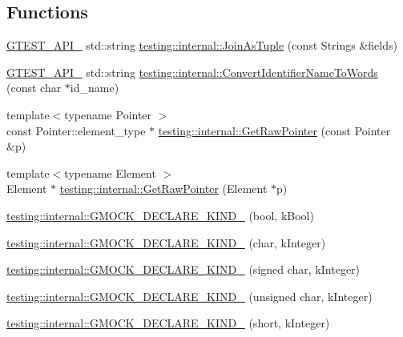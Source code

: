 \subsection*{Functions}
\begin{DoxyCompactItemize}
\item 
\mbox{\hyperlink{gtest-port_8h_aa73be6f0ba4a7456180a94904ce17790}{G\+T\+E\+S\+T\+\_\+\+A\+P\+I\+\_\+}} std\+::string \mbox{\hyperlink{namespacetesting_1_1internal_a4ffe5309bf49f08145ed010a6d244e41}{testing\+::internal\+::\+Join\+As\+Tuple}} (const Strings \&fields)
\item 
\mbox{\hyperlink{gtest-port_8h_aa73be6f0ba4a7456180a94904ce17790}{G\+T\+E\+S\+T\+\_\+\+A\+P\+I\+\_\+}} std\+::string \mbox{\hyperlink{namespacetesting_1_1internal_a0b375abcf3081393e6c420194a541b29}{testing\+::internal\+::\+Convert\+Identifier\+Name\+To\+Words}} (const char $\ast$id\+\_\+name)
\item 
{\footnotesize template$<$typename Pointer $>$ }\\const Pointer\+::element\+\_\+type $\ast$ \mbox{\hyperlink{namespacetesting_1_1internal_ae88d1a6f95165c43c27a6c0e2d357e61}{testing\+::internal\+::\+Get\+Raw\+Pointer}} (const Pointer \&p)
\item 
{\footnotesize template$<$typename Element $>$ }\\Element $\ast$ \mbox{\hyperlink{namespacetesting_1_1internal_a4d17b114b61b805ac5f37e9c26e29e55}{testing\+::internal\+::\+Get\+Raw\+Pointer}} (Element $\ast$p)
\item 
\mbox{\hyperlink{namespacetesting_1_1internal_a20f5584732e44a368e7acf295b639319}{testing\+::internal\+::\+G\+M\+O\+C\+K\+\_\+\+D\+E\+C\+L\+A\+R\+E\+\_\+\+K\+I\+N\+D\+\_\+}} (bool, k\+Bool)
\item 
\mbox{\hyperlink{namespacetesting_1_1internal_ac8f3722ca21d8b14f86e5c949e843508}{testing\+::internal\+::\+G\+M\+O\+C\+K\+\_\+\+D\+E\+C\+L\+A\+R\+E\+\_\+\+K\+I\+N\+D\+\_\+}} (char, k\+Integer)
\item 
\mbox{\hyperlink{namespacetesting_1_1internal_ae5b8e77d245fd0838ab22e439e92e9af}{testing\+::internal\+::\+G\+M\+O\+C\+K\+\_\+\+D\+E\+C\+L\+A\+R\+E\+\_\+\+K\+I\+N\+D\+\_\+}} (signed char, k\+Integer)
\item 
\mbox{\hyperlink{namespacetesting_1_1internal_ab13e89be2f0f22b1da9e22cd53bce5ce}{testing\+::internal\+::\+G\+M\+O\+C\+K\+\_\+\+D\+E\+C\+L\+A\+R\+E\+\_\+\+K\+I\+N\+D\+\_\+}} (unsigned char, k\+Integer)
\item 
\mbox{\hyperlink{namespacetesting_1_1internal_af191a2be9cff1d5900426ef5aa59851e}{testing\+::internal\+::\+G\+M\+O\+C\+K\+\_\+\+D\+E\+C\+L\+A\+R\+E\+\_\+\+K\+I\+N\+D\+\_\+}} (short, k\+Integer)

\end{DoxyCompactItemize}

